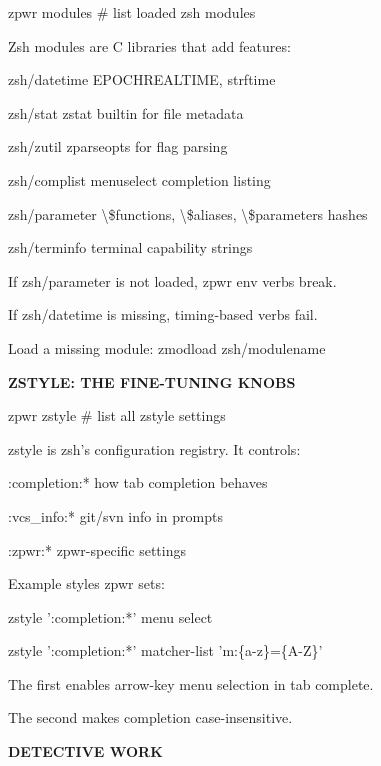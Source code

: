 \documentclass[11pt,a4paper,twoside]{book}
\begin{document}
\begin{codebox}
zpwr modules                        \# list loaded zsh modules\\
\end{codebox}

Zsh modules are C libraries that add features:

zsh/datetime      EPOCHREALTIME, strftime

zsh/stat          zstat builtin for file metadata

zsh/zutil         zparseopts for flag parsing

zsh/complist       menuselect completion listing

zsh/parameter      \textbackslash{}\$functions, \textbackslash{}\$aliases, \textbackslash{}\$parameters hashes

zsh/terminfo       terminal capability strings

If zsh/parameter is not loaded, zpwr env verbs break.

If zsh/datetime is missing, timing-based verbs fail.

Load a missing module: zmodload zsh/modulename


\vspace{12pt}
{\bfseries\color{neonyellow} ZSTYLE: THE FINE-TUNING KNOBS}\vspace{4pt}

\begin{codebox}
zpwr zstyle                         \# list all zstyle settings\\
\end{codebox}

zstyle is zsh's configuration registry. It controls:

:completion:*     how tab completion behaves

:vcs\_info:*       git/svn info in prompts

:zpwr:*           zpwr-specific settings

Example styles zpwr sets:

zstyle ':completion:*' menu select

zstyle ':completion:*' matcher-list 'm:\{a-z\}=\{A-Z\}'

The first enables arrow-key menu selection in tab complete.

The second makes completion case-insensitive.


\vspace{12pt}
{\bfseries\color{neonyellow} DETECTIVE WORK}\vspace{4pt}
\end{document}
